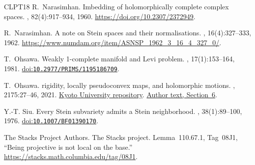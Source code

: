 \documentclass[11pt]{amsart}
\theoremstyle{definition}
\theoremstyle{remark}
\numberwithin{equation}{section}
\begin{document}
\begin{thebibliography}{CLPT18}
R.~Narasimhan.
\newblock Imbedding of holomorphically complete complex spaces.
,
82(4):917--934, 1960.
\newblock \url{https://doi.org/10.2307/2372949}.

R.~Narasimhan.
\newblock A note on {Stein} spaces and their normalisations.
,
16(4):327--333, 1962.
\newblock \url{https://www.numdam.org/item/ASNSP_1962_3_16_4_327_0/}.

T.~Ohsawa.
\newblock Weakly 1-complete manifold and {Levi} problem.
, 17(1):153--164, 1981.
\newblock \href{https://doi.org/10.2977/PRIMS/1195186709}{doi:\nolinkurl{10.2977/PRIMS/1195186709}}.

T.~Ohsawa.
 rigidity, locally pseudoconvex maps, and holomorphic motions.
, 2175:27--46, 2021.
\newblock \href{https://hdl.handle.net/2433/263965}{Kyoto University repository}.
\href{https://www.kurims.kyoto-u.ac.jp/~kyodo/kokyuroku/contents/pdf/2175-03.pdf}{Author text, Section~6}.


Y.-T. Siu.
\newblock Every Stein subvariety admits a Stein neighborhood.
, 38(1):89--100, 1976.
\newblock
\href{https://doi.org/10.1007/BF01390170}
{doi:\nolinkurl{10.1007/BF01390170}}.

{The Stacks Project Authors}.
\newblock The {Stacks} project.
\newblock Lemma~110.67.1, Tag~08J1, ``Being projective is not local on the base.'' \url{https://stacks.math.columbia.edu/tag/08J1}.




\end{thebibliography}
\end{document}
